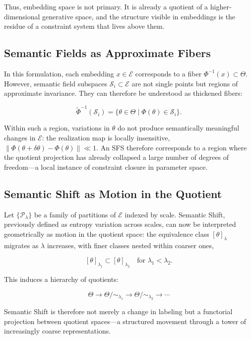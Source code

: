\documentclass[11pt, twoside]{article}
\theoremstyle{plain}
\theoremstyle{definition}
\theoremstyle{remark}
\begin{document}
Thus, embedding space is not primary. It is already a quotient of a higher-dimensional generative space, and the structure visible in embeddings is the residue of a constraint system that lives above them.

\subsection{Semantic Fields as Approximate Fibers}

In this formulation, each embedding $x \in \mathcal{E}$ corresponds to a fiber $\Phi^{-1}(x) \subset \Theta$. However, semantic field subspaces $\mathcal{S}_i \subset \mathcal{E}$ are not single points but regions of approximate invariance. They can therefore be understood as thickened fibers:

\[
\widetilde{\Phi}^{-1}(\mathcal{S}_i) = \{ \theta \in \Theta \mid \Phi(\theta) \in \mathcal{S}_i \}.
\]

Within such a region, variations in $\theta$ do not produce semantically meaningful changes in $\mathcal{E}$: the realization map is locally insensitive, $\|\Phi(\theta + \delta\theta) - \Phi(\theta)\| \ll 1$. An SFS therefore corresponds to a region where the quotient projection has already collapsed a large number of degrees of freedom---a local instance of constraint closure in parameter space.

\subsection{Semantic Shift as Motion in the Quotient}

Let $\{\mathcal{P}_\lambda\}$ be a family of partitions of $\mathcal{E}$ indexed by scale. Semantic Shift, previously defined as entropy variation across scales, can now be interpreted geometrically as motion in the quotient space: the equivalence class $[\theta]_\lambda$ migrates as $\lambda$ increases, with finer classes nested within coarser ones,

\[
[\theta]_{\lambda_1} \subset [\theta]_{\lambda_2} \quad \text{for } \lambda_1 < \lambda_2.
\]

This induces a hierarchy of quotients:

\[
\Theta \to \Theta / {\sim_{\lambda_1}} \to \Theta / {\sim_{\lambda_2}} \to \cdots
\]

Semantic Shift is therefore not merely a change in labeling but a functorial projection between quotient spaces---a structured movement through a tower of increasingly coarse representations.
\end{document}
